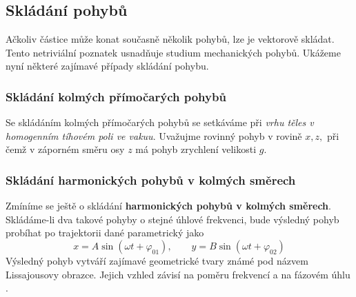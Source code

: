 {    %
    \subsection{Skládání pohybů}
      Ačkoliv částice může konat současně několik pohybů, lze je vektorově skládat. Tento 
      netriviální poznatek usnadňuje studium mechanických pohybů. Ukážeme nyní některé zajímavé 
      případy skládání pohybu.
  
    \subsubsection{Skládání kolmých přímočarých pohybů}
      Se skládáním kolmých přímočarých pohybů se setkáváme při \emph{vrhu těles v homogenním 
      tíhovém poli ve vakuu}. Uvažujme rovinný pohyb v rovině $x, z,$ při čemž v záporném směru osy 
      $z$ má pohyb zrychlení velikosti $g$.

    \subsubsection{Skládání harmonických pohybů v kolmých směrech}
      Zmíníme se ještě o skládání \textbf{harmonických pohybů v kolmých smě\-rech}. Sklá\-dá\-me-li 
      dva takové pohyby o stejné úhlové frekvenci, bude výsledný pohyb probíhat po trajektorii dané 
      parametrický jako
      \begin{equation}\label{mech:eq_lissaujous1}
          x=A\sin(\omega t+\varphi_{01}),\qquad y=B\sin(\omega t +\varphi_{02})
      \end{equation}
      Výsledný pohyb vytváří zajímavé geometrické tvary známé pod názvem Lissajousovy obrazce. 
      Jejich vzhled závisí na poměru frekvencí a na fázovém úhlu \cite{Okrouhlik}.

}
